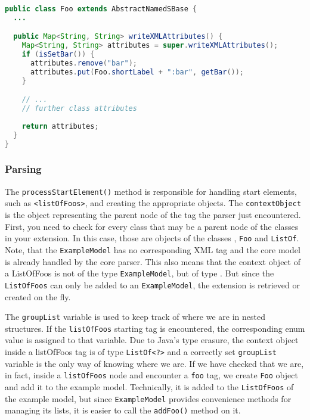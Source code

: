 \begin{lstlisting}[language=Java,caption={Method to write the XML attributes},label={lst:ModelExtCreateXMLAttributes}]
public class Foo extends AbstractNamedSBase {
  ...

  public Map<String, String> writeXMLAttributes() {
    Map<String, String> attributes = super.writeXMLAttributes();
    if (isSetBar()) {
      attributes.remove("bar");
      attributes.put(Foo.shortLabel + ":bar", getBar());
    }

    // ...
    // further class attributes
    
    return attributes;
  }
}
\end{lstlisting}


\subsubsection{Parsing}

The \texttt{processStartElement()} method is responsible for handling start elements, such as \texttt{<listOfFoos>}, and creating the appropriate objects.
The \texttt{contextObject} is the object representing the parent node of the tag the parser just encountered.
First, you need to check for every class that may be a parent node of the classes in your extension.
In this case, those are objects of the classes \Model, \texttt{Foo} and \texttt{ListOf}.
Note, that the \texttt{ExampleModel} has no corresponding XML tag and the core model is already handled by the core parser.
This also means that the context object of a ListOfFoos is not of the type \texttt{ExampleModel}, but of type \Model.
But since the \texttt{ListOfFoos} can only be added to an \texttt{ExampleModel}, the extension is retrieved or created on the fly.

The \texttt{groupList} variable is used to keep track of where we are in nested structures.
If the \texttt{listOfFoos} starting tag is encountered, the corresponding enum value is assigned to that variable.
Due to Java's type erasure, the context object inside a listOfFoos tag is of type \texttt{ListOf<?>} and a correctly set \texttt{groupList} variable is the only way of knowing where we are.
If we have checked that we are, in fact, inside a \texttt{listOfFoos} node and encounter a \texttt{foo} tag, we create \texttt{Foo} object and add it to the example model.
Technically, it is added to the \texttt{ListOfFoos} of the example model, but since \texttt{ExampleModel} provides convenience methods for managing its lists, it is easier to call the \texttt{addFoo()} method on it.

